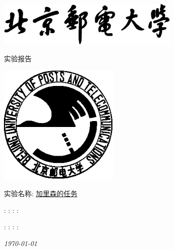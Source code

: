 \begin{titlepage}
    \center
    \includegraphics[width=3.5in]{images/buptname.eps}

    \begin{spacing}{5}
        {\bigsize 实验报告}
    \end{spacing}

    \includegraphics[width=2.3in]{images/buptseal.eps}

    \begin{spacing}{1}
        \vspace{2.5cm}
        \Large{实验名称:} \underline{加里森的任务}
        \vspace{3cm}
    \end{spacing}

    \begin{minipage}{\linewidth}
         : \underline{}
         : \underline{}
         : \underline{}
         : \underline{}
    \end{minipage}

    \begin{minipage}{\linewidth}
         : \underline{}
         : \underline{}
         : \underline{}
         : \underline{}
    \end{minipage}

    {\small\em \today }
\end{titlepage}

